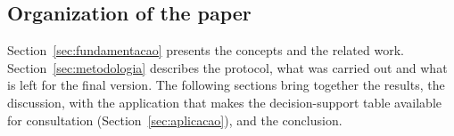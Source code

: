 \subsection{Organization of the paper}
Section~\ref{sec:fundamentacao} presents the concepts and the related work.
Section~\ref{sec:metodologia} describes the protocol, what was carried out and what is left for the final version. The following sections bring together the results, the discussion, with the
application that makes the decision-support table available for consultation (Section~\ref{sec:aplicacao}), and the conclusion.
